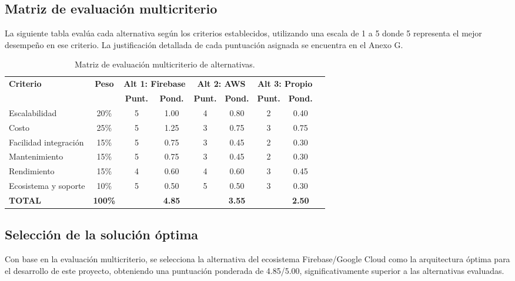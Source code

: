 \subsection{Matriz de evaluación multicriterio}

La siguiente tabla evalúa cada alternativa según los criterios establecidos, utilizando una escala de 1 a 5 donde 5 representa el mejor desempeño en ese criterio. La justificación detallada de cada puntuación asignada se encuentra en el Anexo G.

\begin{table}[H]
\centering
\caption{Matriz de evaluación multicriterio de alternativas.}
\label{tab:matriz_evaluacion}
\begin{tabular}{@{}lcccccccc@{}}
\toprule
\textbf{Criterio} & \textbf{Peso} & \multicolumn{2}{c}{\textbf{Alt 1: Firebase}} & \multicolumn{2}{c}{\textbf{Alt 2: AWS}} & \multicolumn{2}{c}{\textbf{Alt 3: Propio}} \\
\cmidrule(lr){3-4} \cmidrule(lr){5-6} \cmidrule(lr){7-8}
& & \textbf{Punt.} & \textbf{Pond.} & \textbf{Punt.} & \textbf{Pond.} & \textbf{Punt.} & \textbf{Pond.} \\
\midrule
Escalabilidad & 20\% & 5 & 1.00 & 4 & 0.80 & 2 & 0.40 \\
Costo & 25\% & 5 & 1.25 & 3 & 0.75 & 3 & 0.75 \\
Facilidad integración & 15\% & 5 & 0.75 & 3 & 0.45 & 2 & 0.30 \\
Mantenimiento & 15\% & 5 & 0.75 & 3 & 0.45 & 2 & 0.30 \\
Rendimiento & 15\% & 4 & 0.60 & 4 & 0.60 & 3 & 0.45 \\
Ecosistema y soporte & 10\% & 5 & 0.50 & 5 & 0.50 & 3 & 0.30 \\
\midrule
\textbf{TOTAL} & \textbf{100\%} & & \textbf{4.85} & & \textbf{3.55} & & \textbf{2.50} \\
\bottomrule
\end{tabular}
\end{table}

\subsection{Selección de la solución óptima}

Con base en la evaluación multicriterio, se selecciona la alternativa del ecosistema Firebase/Google Cloud como la arquitectura óptima para el desarrollo de este proyecto, obteniendo una puntuación ponderada de 4.85/5.00, significativamente superior a las alternativas evaluadas.

